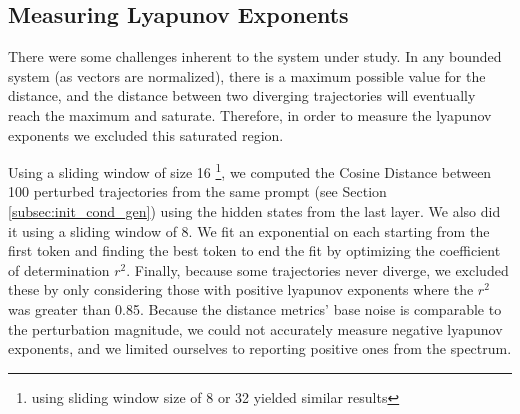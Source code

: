 \documentclass[a4paper,12pt]{article}
\begin{document}

\subsection{Measuring Lyapunov Exponents}
\label{subsec:methods_lyapu}

There were some challenges inherent to the system under study. In any bounded system (as vectors are normalized), there is a maximum possible value for the distance, and the distance between two diverging trajectories will eventually reach the maximum and saturate. Therefore, in order to measure the lyapunov exponents we excluded this saturated region.

Using a sliding window of size 16 \footnote{using sliding window size of 8 or 32 yielded similar results}, we computed the Cosine Distance between 100 perturbed trajectories from the same prompt (see Section \ref{subsec:init_cond_gen}) using the hidden states from the last layer. We also did it using a sliding window of 8. We fit an exponential on each starting from the first token and finding the best token to end the fit by optimizing the coefficient of determination $r^2$. Finally, because some trajectories never diverge, we excluded these by only considering those with positive lyapunov exponents where the $r^2$ was greater than 0.85. Because the distance metrics' base noise is comparable to the perturbation magnitude, we could not accurately measure negative lyapunov exponents, and we limited ourselves to reporting positive ones from the spectrum. 
\end{document}

